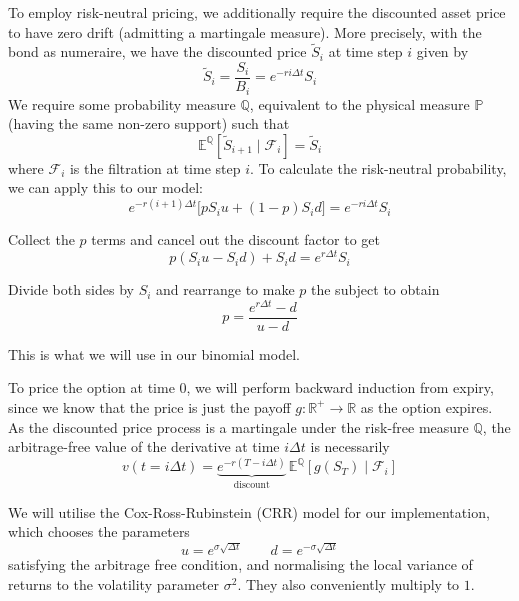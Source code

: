 To employ risk-neutral pricing, we additionally require the discounted asset price to have zero drift (admitting a martingale measure). More precisely, with the bond as numeraire, we have the discounted price $\tilde S_i$ at time step $i$ given by
\begin{equation}
\tilde S_i = \frac{S_i}{B_i} = e^{-ri\Delta t} S_i
\end{equation}
We require some probability measure $\mathbb Q$, equivalent to the physical measure $\mathbb P$ (having the same non-zero support) such that
\begin{equation}
\mathbb E^\mathbb Q [\tilde S_{i+1} \mid \mathcal F_i] = \tilde S_i
\end{equation}
where $\mathcal F_i$ is the filtration at time step $i$. To calculate the risk-neutral probability, we can apply this to our model:
\begin{equation}
e^{-r(i+1)\Delta t}\big[pS_i u + (1-p)S_i d \big] = e^{-ri\Delta t}S_i
\end{equation}

Collect the $p$ terms and cancel out the discount factor to get
\begin{equation}
p(S_i u - S_i d) + S_i d = e^{r\Delta t} S_i
\end{equation}

Divide both sides by $S_i$ and rearrange to make $p$ the subject to obtain
\begin{equation}
p = \frac{e^{r \Delta t} -d}{u-d}
\end{equation}

This is what we will use in our binomial model.

To price the option at time $0$, we will perform backward induction from expiry, since we know that the price is just the payoff $g: \mathbb R^+ \to \mathbb R$ as the option expires. As the discounted price process is a martingale under the risk-free measure $\mathbb Q$, the arbitrage-free value of the derivative at time $i \Delta t$ is necessarily
\begin{equation}
v(t = i\Delta t) = \underbrace{e^{-r(T-i\Delta t)}}_\text{discount} \,\mathbb E^\mathbb Q[g(S_T) \mid \mathcal F_i]
\end{equation}

We will utilise the Cox-Ross-Rubinstein (CRR) model \cite{cox1979option} for our implementation, which chooses the parameters
\begin{equation}
u = e^{\sigma \sqrt{\Delta t}}\qquad d = e^{-\sigma \sqrt{\Delta t}}
\end{equation}
satisfying the arbitrage free condition, and normalising the local variance of returns to the volatility parameter $\sigma^2$. They also conveniently multiply to $1$.

